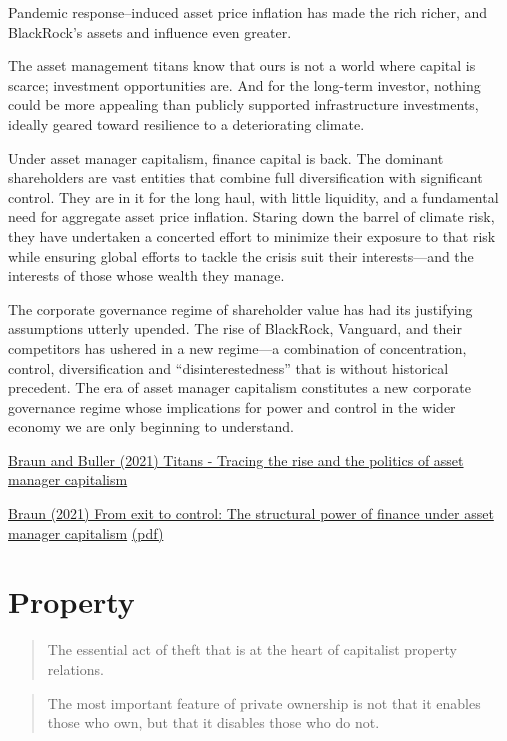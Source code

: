 \documentclass[
]{book}
\begin{document}
Pandemic response--induced asset price inflation has made the rich richer, and BlackRock's assets and influence even greater.

The asset management titans know that ours is not a world where capital is scarce; investment opportunities are. And for the long-term investor, nothing could be more appealing than publicly supported infrastructure investments, ideally geared toward resilience to a deteriorating climate.

Under asset manager capitalism, finance capital is back. The dominant shareholders are vast entities that combine full diversification with significant control. They are in it for the long haul, with little liquidity, and a fundamental need for aggregate asset price inflation. Staring down the barrel of climate risk, they have undertaken a concerted effort to minimize their exposure to that risk while ensuring global efforts to tackle the crisis suit their interests---and the interests of those whose wealth they manage.

The corporate governance regime of shareholder value has had its justifying assumptions utterly upended. The rise of BlackRock, Vanguard, and their competitors has ushered in a new regime---a combination of concentration, control, diversification and ``disinterestedness'' that is without historical precedent. The era of asset manager capitalism constitutes a new corporate governance regime whose implications for power and control in the wider economy we are only beginning to understand.

\href{https://www.phenomenalworld.org/analysis/blackrock-asset-manager-capitalism/}{Braun and Buller (2021) Titans - Tracing the rise and the politics of asset manager capitalism}

\href{https://osf.io/preprints/socarxiv/4uesc}{Braun (2021) From exit to control: The structural power of finance under asset manager capitalism}
\href{pdf/Braun_2021_Asset_Mamager_Capitalism.pdf}{(pdf)}

\hypertarget{property}{%
\chapter{Property}\label{property}}

\begin{quote}
The essential act of theft that is at the heart of capitalist property relations.
\end{quote}

\begin{quote}
The most important feature of private ownership is not that it enables those who own, but that it disables those who do not.
\end{quote}
\end{document}
